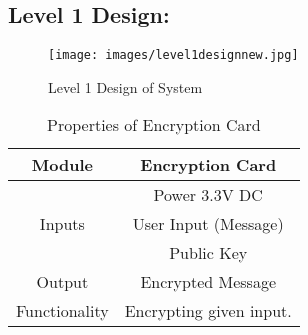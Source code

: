 \documentclass[12pt]{article}
\begin{document}
	\subsection{Level 1 Design:}

	\begin{figure}[H]
		\centering
		\label{Level 1 Design of System }
		\texttt{[image: images/level1designnew.jpg]}\\[0.5 cm]	
		\caption{Level 1 Design of System } 		
	\end{figure}
	

\begin{table}[h]

	\centering
	
	\label{Properties of Encryption Card}
	\begin{tabular}{|c|c|}
		\hline
		Module & Encryption Card \\ \hline
		\multirow{3}{*}{Inputs} & Power 3.3V DC \\
		\cline{2-2}
		& User Input (Message) \\
		\cline{2-2}
		& Public Key \\ \hline
		Output & Encrypted Message \\ \hline
		Functionality & Encrypting given input.\\ \hline		
	\end{tabular}
	\caption{Properties of Encryption Card}

\end{table}
\end{document}

